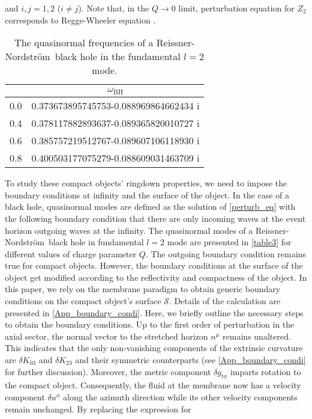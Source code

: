 \documentclass[aps,prd,twocolumn,floatfix,noshowpacs,tightenlines,noshowkeys,superscriptaddress,amsmath,amssymb,
nofootinbib]{revtex4-1}
\renewcommand\[{\begin{equation}}
\renewcommand\]{\end{equation}}
\def\RN{Reissner-Nordstr\"{o}m}
\begin{document}
and $i,j=1,2$ ($i\neq j$). Note that, in the $Q\to 0$ limit, perturbation equation for $Z_{2}$ corresponds to Regge-Wheeler equation \cite{PhysRev.108.1063,Chandrasekhar:1985kt}. \par
\begin{table}[]
	\centering
	\def\arraystretch{1.2}      	
	\setlength{\tabcolsep}{1.4em}
	\begin{tabular}{|c|c|} 
		\hline
		\text{Q} & $\omega _{\text{BH}}$ \\
		\hline
		0.0 & 0.373673895745753-0.088969864662434 i \\
		\hline
		0.4 & 0.378117882893637-0.089365820010727 i \\
		\hline
		0.6 & 0.385757219512767-0.089607106118930 i \\
		\hline
		0.8 & 0.400503177075279-0.088609031463709 i \\
		\hline
	\end{tabular}
	\caption{The quasinormal frequencies of a \RN\ black hole in the fundamental $l=2$ mode. }\label{table3}
\end{table} 
To study these compact objects' ringdown properties, we need to impose the boundary conditions at infinity and the surface of the object. In the case of a black hole, quasinormal modes are defined as the solution of \autoref{perturb_eq} with the following boundary condition that there are only incoming waves at the event horizon outgoing waves at the infinity. The quasinormal modes of a \RN\ black hole in fundamental $l=2$ mode are presented in \autoref{table3} for different values of charge parameter $Q$. The outgoing boundary condition remains true for compact objects. However, the boundary conditions at the surface of the object get modified according to the reflectivity and compactness of the object. In this paper, we rely on the membrane paradigm to obtain generic boundary conditions on the compact object's surface $\mathcal{S}$. Details of the calculation are presented in  \autoref{App_boundary_condi}. Here, we briefly outline the necessary steps to obtain the boundary conditions. Up to the first order of perturbation in the axial sector, the normal vector to the stretched horizon $n^\mu$ remains unaltered. This indicates that the only non-vanishing components of the extrinsic curvature are $\delta K_{03}$ and $\delta K_{23}$ and their symmetric counterparts (see \autoref{App_boundary_condi} for further discussion). Moreover, the metric component $\delta g_{t\phi}$ imparts rotation to the compact object. Consequently, the fluid at the membrane now has a velocity component $\delta u^\phi$ along the azimuth direction while its other velocity components remain unchanged. By replacing the expression for 
\end{document}
